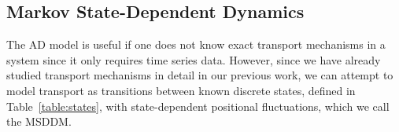 \documentclass{article}
\begin{document}
  
  


  \subsection{Markov State-Dependent Dynamics}\label{section:msm_results}
  
  The AD model is useful if one does not know exact transport mechanisms 
  in a system since it only requires time series data. However, since we have
  already studied transport mechanisms in detail in our previous work, we can
  attempt to model transport as transitions between known discrete
  states, defined in Table~\ref{table:states}, with state-dependent positional
  fluctuations, which we call the MSDDM.
  
\end{document}
